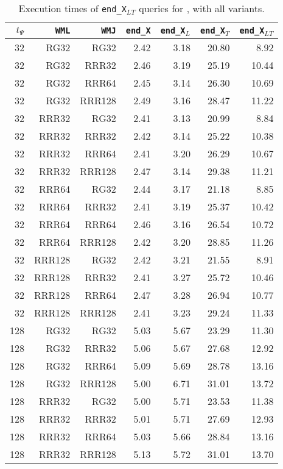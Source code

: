 \begin{table}
\caption{Execution times of \texttt{end\_X$_{LT}$} queries for \ctr, with all variants.}
\begin{tabular}{|r|r|r|r|r|r|r|}
\hline
$t_{\Psi}$ & \texttt{WML} & \texttt{WMJ} & \texttt{end\_X} & \texttt{end\_X$_{L}$} & \texttt{end\_X$_{T}$} & \texttt{end\_X$_{LT}$} \\
\hline
32 & RG32 & RG32 & 2.42 & 3.18 & 20.80 & 8.92 \\
32 & RG32 & RRR32 & 2.46 & 3.19 & 25.19 & 10.44 \\
32 & RG32 & RRR64 & 2.45 & 3.14 & 26.30 & 10.69 \\
32 & RG32 & RRR128 & 2.49 & 3.16 & 28.47 & 11.22 \\
32 & RRR32 & RG32 & 2.41 & 3.13 & 20.99 & 8.84 \\
32 & RRR32 & RRR32 & 2.42 & 3.14 & 25.22 & 10.38 \\
32 & RRR32 & RRR64 & 2.41 & 3.20 & 26.29 & 10.67 \\
32 & RRR32 & RRR128 & 2.47 & 3.14 & 29.38 & 11.21 \\
32 & RRR64 & RG32 & 2.44 & 3.17 & 21.18 & 8.85 \\
32 & RRR64 & RRR32 & 2.41 & 3.19 & 25.37 & 10.42 \\
32 & RRR64 & RRR64 & 2.46 & 3.16 & 26.54 & 10.72 \\
32 & RRR64 & RRR128 & 2.42 & 3.20 & 28.85 & 11.26 \\
32 & RRR128 & RG32 & 2.42 & 3.21 & 21.55 & 8.91 \\
32 & RRR128 & RRR32 & 2.41 & 3.27 & 25.72 & 10.46 \\
32 & RRR128 & RRR64 & 2.47 & 3.28 & 26.94 & 10.77 \\
32 & RRR128 & RRR128 & 2.41 & 3.23 & 29.24 & 11.33 \\
128 & RG32 & RG32 & 5.03 & 5.67 & 23.29 & 11.30 \\
128 & RG32 & RRR32 & 5.06 & 5.67 & 27.68 & 12.92 \\
128 & RG32 & RRR64 & 5.09 & 5.69 & 28.78 & 13.16 \\
128 & RG32 & RRR128 & 5.00 & 6.71 & 31.01 & 13.72 \\
128 & RRR32 & RG32 & 5.00 & 5.71 & 23.53 & 11.38 \\
128 & RRR32 & RRR32 & 5.01 & 5.71 & 27.69 & 12.93 \\
128 & RRR32 & RRR64 & 5.03 & 5.66 & 28.84 & 13.16 \\
128 & RRR32 & RRR128 & 5.13 & 5.72 & 31.01 & 13.70 \\

\end{tabular}
\end{table}
